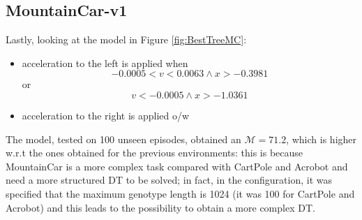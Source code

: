 \subsection{MountainCar-v1}
\label{subsec:443}
Lastly, looking at the model in Figure \ref{fig:BestTreeMC}:
\begin{itemize}
    \item acceleration to the left is applied when \[ -0.0005 < \textit{v} < 0.0063 \land \textit{x} > -0.3981\] or \[\textit{v} < -0.0005 \land \textit{x} > -1.0361\]
    \item acceleration to the right is applied o/w
\end{itemize}
The model, tested on 100 unseen episodes, obtained an $\mathcal{M}=71.2$, which is higher w.r.t the ones obtained for the previous environments: this is because MountainCar is a more complex task compared with CartPole and Acrobot and need a more structured DT to be solved; in fact, in the configuration, it was specified that the maximum genotype length is 1024 (it was 100 for CartPole and Acrobot) and this leads to the possibility to obtain a more complex DT.

\newpage